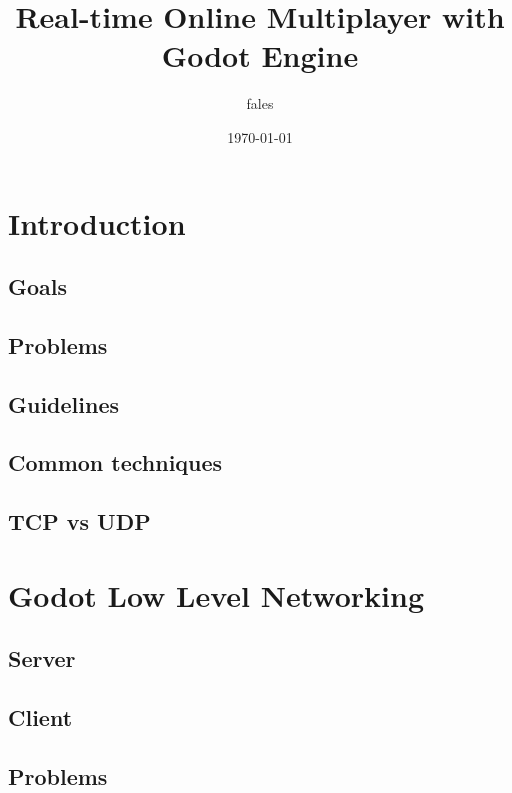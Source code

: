 \documentclass{beamer}
\author{fales}%
\title{Real-time Online Multiplayer with Godot Engine}
\date{\today}
\begin{document}
\begin{nohead}
  \begin{nofoot}
  \frame{\titlepage}
  \end{nofoot}

  \begin{frame}{}
    \begin{multicols}{2}
      \setcounter{tocdepth}{2}
      \tableofcontents
    \end{multicols}
  \end{frame}
\end{nohead}

\section{Introduction}
\subsection{Goals}

\subsection{Problems}


\subsection{Guidelines}

\subsection{Common techniques}

\subsection{TCP vs UDP}


\section{Godot Low Level Networking}
\subsection{Server}

\subsection{Client}

\subsection{Problems}

\end{document}
